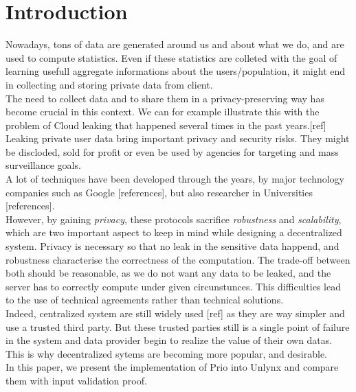 \documentclass{article}
\begin{document}
\newpage
\tableofcontents
\newpage



\section*{Introduction}
Nowadays, tons of data are generated around us and about what we do, and are used to compute statistics. Even if these statistics are colleted with the goal of learning usefull aggregate informations about the users/population, it might end in collecting and storing private data from client.\\
The need to collect data and to share them in a privacy-preserving way has become crucial in this context.
We can for example illustrate this with the problem of Cloud leaking that happened several times in the past years.[ref]\\
Leaking private user data bring important privacy and security risks. They might be discloded, sold for profit or even be used by agencies for targeting and mass surveillance goals.\\
A lot of techniques have been developed through the years, by major technology companies such as Google [references], but also researcher in Universities [references].\\
However, by gaining \textit{privacy}, these protocols sacrifice \textit{robustness} and \textit{scalability}, which are two important aspect to keep in mind while designing a decentralized system. Privacy is necessary so that no leak in the sensitive data happend, and robustness characterise the correctness of the computation. The trade-off between both should be reasonable, as we do not want any data to be leaked, and the server has to correctly compute under given circunstunces.
This difficulties lead to the use of technical agreements rather than technical solutions.\\
Indeed, centralized system are still widely used [ref] as they are way simpler and use a trusted third party. But these trusted parties still is a single point of failure in the system and data provider begin to realize the value of their own datas.\\
This is why decentralized sytems are becoming more popular, and desirable.\\
In this paper, we present the implementation of Prio into Unlynx and compare them with input validation proof.
\end{document}
